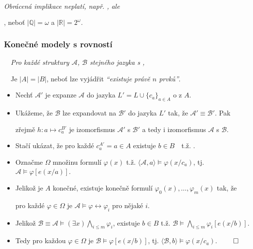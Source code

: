     \vspace{-6mm}
    {\it {}}\ \ {\it Obrácená implikace  neplatí, např. , ale
    \smallskip
    
    , neboť $|\mathbb{Q}|=\omega$ a $|\mathbb{R}|=2^\omega$.}
    
    
    
    \subsubsection*{Konečné modely s rovností}
    
    {\bf {}}\ \ {\it Pro každé  struktury $\mathcal{A}$, $\mathcal{B}$ stejného jazyka s ,}
    \vspace{-2mm}
    
    \vspace{-6mm}
    {\it {}}\ \ Je $|A|=|B|$, neboť lze vyjádřit \emph{``existuje právě $n$ prvků''}.
    \begin{itemize}
    \item Nechť $\mathcal{A}'$ je expanze $\mathcal{A}$ do jazyka $L'=L\cup\{c_a\}_{a\in A}$ o  z $A$.
    \item Ukážeme, že $\mathcal{B}$ lze expandovat na $\mathcal{B}'$ do jazyka $L'$ tak, že $\mathcal{A}'\equiv \mathcal{B}'$. Pak
    \vspace{0.5mm}
    
    zřejmě $h\colon a \mapsto c_a^{B'}$ je izomorfismus $\mathcal{A}'$ s $\mathcal{B}'$ a tedy i izomorfismus $\mathcal{A}$ s $\mathcal{B}$.
    \item Stačí ukázat, že pro každé $c^{A'}_a=a\in A$ existuje $b\in B$\ \ t.ž. .
    \item Označme $\Omega$ množinu formulí $\varphi(x)$ t.ž. $\langle \mathcal{A},a\rangle \models \varphi(x/c_a)$, tj. $\mathcal{A}\models \varphi[e(x/a)]$.
    \item Jelikož je $A$ konečné, existuje konečně formulí $\varphi_0(x),\dots,\varphi_m(x)$ tak, že
    \vspace{0.5mm}
    
    pro každé $\varphi \in \Omega$ je $\mathcal{A}\models \varphi \leftrightarrow \varphi_i$ pro nějaké $i$.
    \item Jelikož $\mathcal{B}\equiv\mathcal{A}\models (\exists x)\bigwedge_{i\le m}\varphi_i$, existuje $b\in B$ t.ž. $\mathcal{B}\models \bigwedge_{i\le m}\varphi_i[e(x/b)]$.
    \item Tedy pro každou $\varphi\in \Omega$ je $\mathcal{B}\models \varphi[e(x/b)]$, tj. $\langle\mathcal{B},b\rangle\models \varphi(x/c_a)$. $\qed$
    \end{itemize}
    \smallskip
    
